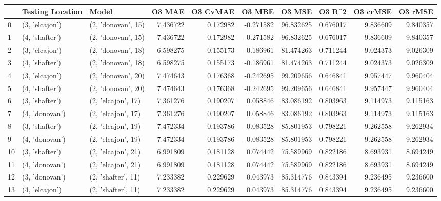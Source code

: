 \begin{tabular}{lllrrrrrrr}
\toprule
{} & Testing Location &               Model &    O3 MAE &  O3 CvMAE &    O3 MBE &      O3 MSE &    O3 R\textasciicircum2 &   O3 crMSE &    O3 rMSE \\
\midrule
0  &   (3, 'elcajon') &  (2, 'donovan', 15) &  7.436722 &  0.172982 & -0.271582 &   96.832625 &  0.676017 &   9.836609 &   9.840357 \\
1  &   (4, 'shafter') &  (2, 'donovan', 15) &  7.436722 &  0.172982 & -0.271582 &   96.832625 &  0.676017 &   9.836609 &   9.840357 \\
2  &   (3, 'elcajon') &  (2, 'donovan', 18) &  6.598275 &  0.155173 & -0.186961 &   81.474263 &  0.711244 &   9.024373 &   9.026309 \\
3  &   (4, 'shafter') &  (2, 'donovan', 18) &  6.598275 &  0.155173 & -0.186961 &   81.474263 &  0.711244 &   9.024373 &   9.026309 \\
4  &   (3, 'elcajon') &  (2, 'donovan', 20) &  7.474643 &  0.176368 & -0.242695 &   99.209656 &  0.646841 &   9.957447 &   9.960404 \\
5  &   (4, 'shafter') &  (2, 'donovan', 20) &  7.474643 &  0.176368 & -0.242695 &   99.209656 &  0.646841 &   9.957447 &   9.960404 \\
6  &   (3, 'shafter') &  (2, 'elcajon', 17) &  7.361276 &  0.190207 &  0.058846 &   83.086192 &  0.803963 &   9.114973 &   9.115163 \\
7  &   (4, 'donovan') &  (2, 'elcajon', 17) &  7.361276 &  0.190207 &  0.058846 &   83.086192 &  0.803963 &   9.114973 &   9.115163 \\
8  &   (3, 'shafter') &  (2, 'elcajon', 19) &  7.472334 &  0.193786 & -0.083528 &   85.801953 &  0.798221 &   9.262558 &   9.262934 \\
9  &   (4, 'donovan') &  (2, 'elcajon', 19) &  7.472334 &  0.193786 & -0.083528 &   85.801953 &  0.798221 &   9.262558 &   9.262934 \\
10 &   (3, 'shafter') &  (2, 'elcajon', 21) &  6.991809 &  0.181128 &  0.074442 &   75.589969 &  0.822186 &   8.693931 &   8.694249 \\
11 &   (4, 'donovan') &  (2, 'elcajon', 21) &  6.991809 &  0.181128 &  0.074442 &   75.589969 &  0.822186 &   8.693931 &   8.694249 \\
12 &   (3, 'donovan') &  (2, 'shafter', 11) &  7.233382 &  0.229629 &  0.043973 &   85.314776 &  0.843394 &   9.236495 &   9.236600 \\
13 &   (4, 'elcajon') &  (2, 'shafter', 11) &  7.233382 &  0.229629 &  0.043973 &   85.314776 &  0.843394 &   9.236495 &   9.236600 \\

\end{tabular}
